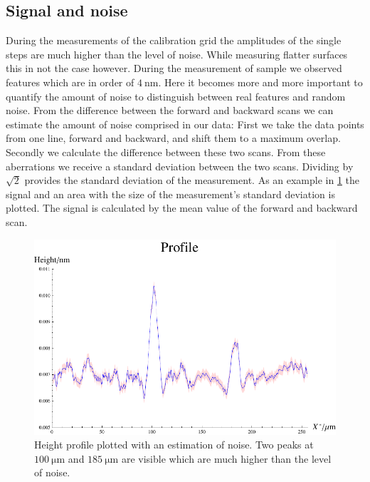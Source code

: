 \documentclass[paper=a4,fontsize=10pt,DIV=18,twocolumn,parskip=half]{scrartcl}
\numberwithin{equation}{section}    %
\begin{document}
\subsection{Signal and noise}
During the measurements of the calibration grid the amplitudes of the single 
steps are much higher than the level of noise. While measuring flatter surfaces 
this in not the case however. During the measurement of sample  
we observed features which are in order of $\SI{4}{\nano\meter}$.  Here it 
becomes more and more important to quantify the amount of noise to distinguish 
between real features and random noise.
From the difference between the forward and backward scans we can estimate the 
amount of noise comprised in our data: First we take the data points from one 
line, forward and backward, and shift them to a maximum overlap. Secondly we 
calculate the difference between these two scans. From these aberrations we 
receive a standard deviation between the two scans. Dividing by $\sqrt{2}$  
provides the standard deviation of the measurement.
As an example in \cref{noise} the signal and an area with the size of the 
measurement's standard deviation is plotted. The signal is calculated by the 
mean value of the forward and backward scan.

\begin{figure}
    \begin{center}
        \includegraphics[width=\columnwidth]{Bilder/sn_signal2}
        \caption{Height profile plotted with an estimation of noise. Two peaks 
        at $\SI{100}{\micro\meter}$ and $\SI{185}{\micro\meter}$ are visible 
        which are much higher than the level of noise. }
        \label{noise}
    \end{center}
\end{figure}
\end{document}
